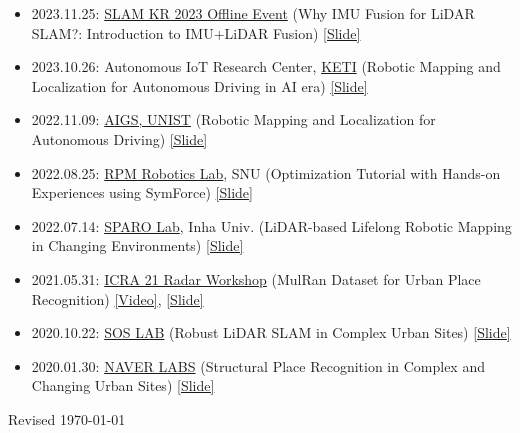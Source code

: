 \documentclass{cv} %
\begin{document}
\begin{itemize}[label=$\cdot$]
    \item 2023.11.25: \href{https://drive.google.com/file/d/1h5sMgkyGGA8X2gxJUEzWCSwX9RlujNpe/view?usp=sharing}{SLAM KR 2023 Offline Event} (Why IMU Fusion for LiDAR SLAM?: Introduction to IMU+LiDAR Fusion) \href{https://bit.ly/20231125_slamkr_giseopkim}{[Slide]}
    
    \item 2023.10.26: Autonomous IoT Research Center, \href{https://www.keti.re.kr/eng/main/main.php}{KETI} (Robotic Mapping and Localization for Autonomous Driving in AI era) \href{https://bit.ly/408J7XJ}{[Slide]}
    
    \item 2022.11.09: \href{https://ib.unist.ac.kr/robust-slam-simultaneous-localization-and-mapping-for-large-scale-urban-mapping-and-autonomous-driving/}{AIGS, UNIST} (Robotic Mapping and Localization for Autonomous Driving) \href{https://docs.google.com/presentation/d/1RLrrxGzzGWEgUQMvdWH0wNfsyn6ML2Hjw88PmgdrvlQ/edit?usp=sharing}{[Slide]}
    
    \item 2022.08.25: \href{https://rpm.snu.ac.kr/}{RPM Robotics Lab}, SNU (Optimization Tutorial with Hands-on Experiences using SymForce) \href{https://docs.google.com/presentation/d/1Z1FjnphgP60jTIa6da8vwhaAEzULefLrPQsJ4yBHAJA/edit?usp=sharing}{[Slide]}
    
    \item 2022.07.14: \href{https://sites.google.com/view/sparo/홈}{SPARO Lab}, Inha Univ. (LiDAR-based Lifelong Robotic Mapping in Changing Environments) \href{https://docs.google.com/presentation/d/1Muld60rT7KY_FaN4hyRaPHR2FsPkLV8z7fz7rYQzIv4/edit?usp=sharing}{[Slide]}
    
    \item 2021.05.31: \href{https://sites.google.com/view/radar-robotics/home}{ICRA 21 Radar Workshop} (MulRan Dataset for Urban Place Recognition) \href{https://www.youtube.com/watch?v=jFvKW9Kj8Ts}{[Video]}, \href{https://www.dropbox.com/s/dknylah6b7rizr8/20210531\%20icra\%20ws\%20mulran\%20v3.pptx?dl=0}{[Slide]}
    
    \item 2020.10.22: \href{http://soslab.co/}{SOS LAB} (Robust LiDAR SLAM in Complex Urban Sites) \href{https://www.dropbox.com/s/p30dpjqjbjhq69x/20201022\%20SOSLAB\%20talk\%20Giseop\%20Kim\%20share.pdf?dl=0}{[Slide]}
    
    \item 2020.01.30: \href{https://www.naverlabs.com/}{NAVER LABS} (Structural Place Recognition in Complex and Changing Urban Sites) \href{https://www.google.com/url?q=https\%3A\%2F\%2Fwww.dropbox.com\%2Fs\%2Fcoul2elzlulbj1j\%2FStructural\%2520Place\%2520Recognition\%2520in\%2520Complex\%2520and\%2520Changing\%2520Urban\%2520Sites.pptx\%3Fdl\%3D0&sa=D&sntz=1&usg=AFQjCNF6McgylrY6kU5KmqvCLC6_n-TzIw}{[Slide]}
\end{itemize}





\hfill Revised \today
\end{document}
